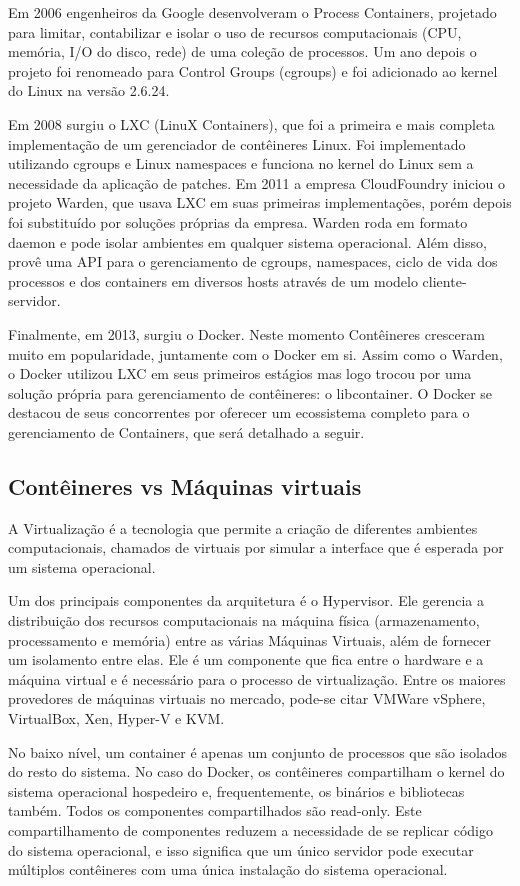 \documentclass[]{politex}
\begin{document}
	Em 2006 engenheiros da Google desenvolveram o Process Containers, projetado para limitar, contabilizar e isolar o uso de recursos computacionais (CPU, memória, I/O do disco, rede) de uma coleção de processos. Um ano depois o projeto foi renomeado para Control Groups (cgroups) e foi adicionado ao kernel do Linux na versão 2.6.24.

	Em 2008 surgiu o LXC (LinuX Containers), que foi a primeira e mais completa implementação de um gerenciador de contêineres Linux. Foi implementado utilizando cgroups e Linux namespaces e funciona no kernel do Linux sem a necessidade da aplicação de patches.
	Em 2011 a empresa CloudFoundry iniciou o projeto Warden, que usava LXC em suas primeiras implementações, porém depois foi substituído por soluções próprias da empresa. Warden roda em formato daemon e pode isolar ambientes em qualquer sistema operacional. Além disso, provê uma API para o gerenciamento de cgroups, namespaces, ciclo de vida dos processos e dos containers em diversos hosts através de um modelo cliente-servidor.

	Finalmente, em 2013, surgiu o Docker. Neste momento Contêineres cresceram muito em popularidade, juntamente com o Docker em si.
	Assim como o Warden, o Docker utilizou LXC em seus primeiros estágios mas logo trocou por uma solução própria para gerenciamento de contêineres: o libcontainer.
	O Docker se destacou de seus concorrentes por oferecer um ecossistema completo para o gerenciamento de Containers, que será detalhado a seguir.
	
	\subsection{Contêineres vs Máquinas virtuais}
	
	A Virtualização é a tecnologia que permite a criação de diferentes ambientes computacionais, chamados de virtuais por simular a interface que é esperada por um sistema operacional.
	
	Um dos principais componentes da arquitetura é o Hypervisor. Ele gerencia a distribuição dos recursos computacionais na máquina física (armazenamento, processamento e memória) entre as várias Máquinas Virtuais, além de fornecer um isolamento entre elas. Ele é um componente que fica entre o hardware e a máquina virtual e é necessário para o processo de virtualização.
	Entre os maiores provedores de máquinas virtuais no mercado, pode-se citar VMWare vSphere, VirtualBox, Xen, Hyper-V e KVM.

	No baixo nível, um container é apenas um conjunto de processos que são isolados do resto do sistema. No caso do Docker, os contêineres compartilham o kernel do sistema operacional hospedeiro e, frequentemente, os binários e bibliotecas também. Todos os componentes compartilhados são read-only. Este compartilhamento de componentes reduzem a necessidade de se replicar código do sistema operacional, e isso significa que um único servidor pode executar múltiplos contêineres com uma única instalação do sistema operacional.
\end{document}
